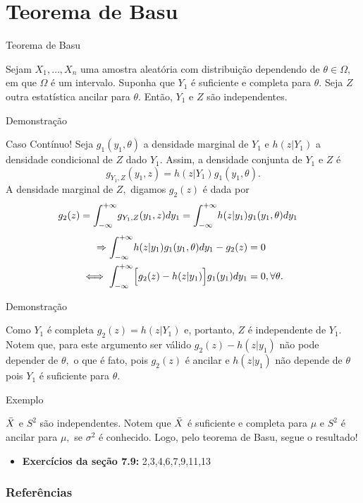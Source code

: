\documentclass[12pt]{beamer}
\begin{document}
\section{Teorema de Basu}
\begin{frame}{Teorema de Basu}
\begin{Teorema}
\justifying
Sejam $X_{1},\ldots,X_{n}$ uma amostra aleatória com distribuição dependendo de $\theta\in\Omega,$ em que $\Omega$ é um intervalo. Suponha que $Y_{1}$ é suficiente e completa para $\theta.$ Seja $Z$ outra estatística ancilar para $\theta.$ Então, $Y_{1}$ e $Z$ são independentes.
\end{Teorema}
\end{frame}

\begin{frame}{Demonstração}
\vspace{-0.2cm}
\begin{block}{Caso Contínuo!}
\justifying
Seja $g_{1}(y_{1},\theta)$ a densidade marginal de $Y_{1}$ e $h(z|Y_{1})$ a densidade condicional de $Z$ dado $Y_{1}.$ Assim, a densidade conjunta de $Y_{1}$ e $Z$ é $$g_{Y_{1},Z}(y_{1},z)=h(z|Y_{1})g_{1}(y_{1},\theta).$$
A densidade marginal de $Z,$ digamos $g_{2}(z)$ é dada por
\begin{align*}
    g_{2}(z)&={\displaystyle \int_{-\infty}^{+\infty}} g_{Y_{1},Z}(y_{1},z)dy_{1}={\displaystyle \int_{-\infty}^{+\infty}} h(z|y_{1})g_{1}(y_{1},\theta)dy_{1}
\end{align*}
\pause
\vspace{-0.4cm}
\begin{align*}
\Rightarrow {\displaystyle \int_{-\infty}^{+\infty}} h(z|y_{1})g_{1}(y_{1},\theta)dy_{1}-g_{2}(z)&=0\\ 
\iff {\displaystyle \int_{-\infty}^{+\infty}} \Big[g_{2}(z)-h(z|y_{1})\Big]g_{1}(y_{1})dy_{1}&=0,\forall \theta.
\end{align*}
\end{block}
\end{frame}

\begin{frame}{Demonstração}
\begin{block}{}
\justifying
Como $Y_{1}$ é completa $g_{2}(z)=h(z|Y_{1})$ e, portanto, $Z$ é independente de $Y_{1}.$ Notem que, para este argumento ser válido $g_{2}(z)-h(z|y_{1})$ não pode depender de $\theta,$ o que é fato, pois $g_{2}(z)$ é ancilar e $h(z|y_{1})$ não depende de $\theta$ pois $Y_{1}$ é suficiente para $\theta.$
\end{block}
\end{frame}

\begin{frame}{Exemplo}
\begin{block}{}
\justifying
$\Bar{X}$ e $S^{2}$ são independentes. Notem que $\Bar{X}$ é suficiente e completa para $\mu$ e $S^{2}$ é ancilar para $\mu,$ se $\sigma^{2}$ é conhecido. Logo, pelo teorema de Basu, segue o resultado!
\end{block}
\end{frame}

\begin{frame}{}
\begin{block}{}
\justifying
\begin{itemize}
    \item \textbf{Exercícios da seção 7.9:} 2,3,4,6,7,9,11,13
\end{itemize}
\end{block}
\end{frame}

\begin{frame}[allowframebreaks]
\frametitle{\bf Referências}
\printbibliography
\end{frame}
\end{document}
